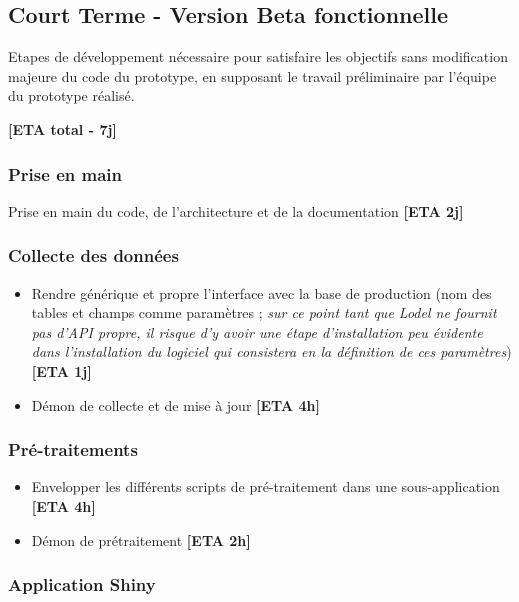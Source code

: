 \documentclass[11pt]{article}
\begin{document}
\subsection{Court Terme - Version Beta fonctionnelle}

Etapes de développement nécessaire pour satisfaire les objectifs sans modification majeure du code du prototype, en supposant le travail préliminaire par l'équipe du prototype réalisé.

\textbf{[ETA total - 7j]}

\subsubsection*{Prise en main}

Prise en main du code, de l'architecture et de la documentation \textbf{[ETA 2j]}


\subsubsection*{Collecte des données}

\begin{itemize}
\item Rendre générique et propre l'interface avec la base de production (nom des tables et champs comme paramètres ; \textit{sur ce point tant que Lodel ne fournit pas d'API propre, il risque d'y avoir une étape d'installation peu évidente dans l'installation du logiciel qui consistera en la définition de ces paramètres}) \textbf{[ETA 1j]}
\item Démon de collecte et de mise à jour \textbf{[ETA 4h]}
\end{itemize}



\subsubsection*{Pré-traitements}


\begin{itemize}
\item Envelopper les différents scripts de pré-traitement dans une sous-application \textbf{[ETA 4h]}
\item Démon de prétraitement \textbf{[ETA 2h]}
\end{itemize}



\subsubsection*{Application Shiny}
\end{document}
